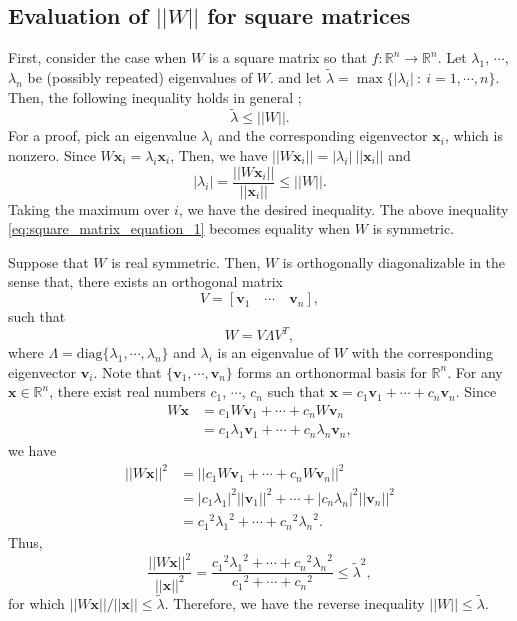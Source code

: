 \documentclass[12pt]{report}
\numberwithin{figure}{chapter}
\theoremstyle{plain}
\theoremstyle{definition}
\theoremstyle{corollary}
\theoremstyle{definition}
\theoremstyle{plain}
\theoremstyle{definition}
\theoremstyle{plain}
\newcommand\bx{\ensuremath{\boldsymbol x}}
\newcommand\bv{\ensuremath{\boldsymbol v}}
\begin{document}
%
\subsection{Evaluation of \(||W||\) for square matrices}

First, consider the case when \(W\) is a square matrix so that \(f:\mathbb R^n\to\mathbb R^n\).
Let \(\lambda_1\), \(\cdots\), \(\lambda_n\) be (possibly repeated) eigenvalues of \(W\).
 and let \(\tilde\lambda=\max\{|\lambda_i|\::\:i=1,\cdots,n\}\).
Then, the following inequality holds in general ;
\begin{equation}\label{eq:square_matrix_equation_1}
\tilde\lambda\le||W||.
\end{equation}
For a proof, pick an eigenvalue \(\lambda_i\) and the corresponding eigenvector \(\bx_i\), which is nonzero.
Since \(W\bx_i=\lambda_i\bx_i\),
Then, we have \(||W\bx_i||=|\lambda_i|\:||\bx_i||\) and
\[|\lambda_i|=\frac{||W\bx_i||}{||\bx_i||}\le||W||.\]
Taking the maximum over \(i\), we have the desired inequality.
The above inequality \eqref{eq:square_matrix_equation_1} becomes equality when \(W\) is symmetric.

Suppose that \(W\) is real symmetric.
Then, \(W\) is orthogonally diagonalizable in the sense that, there exists an orthogonal matrix
\[V=[\bv_1\quad \cdots \quad \bv_n],\]
such that
\[W=V\Lambda V^T,\]
where \(\Lambda=\text{diag}\{\lambda_1,\cdots,\lambda_n\}\) and \(\lambda_i\) is an eigenvalue of \(W\) with the corresponding eigenvector \(\bv_i\).
Note that \(\{\bv_1,\cdots,\bv_n\}\) forms an orthonormal basis for \(\mathbb R^n\).
For any \(\bx\in\mathbb R^n\), there exist real numbers \(c_1\), \(\cdots\), \(c_n\) such that \(\bx=c_1\bv_1+\cdots+c_n\bv_n\).
Since
\begin{align*}
W\bx
&=c_1W\bv_1+\cdots+c_nW\bv_n\\
&=c_1\lambda_1\bv_1+\cdots+c_n\lambda_n\bv_n,
\end{align*}
we have
\begin{align*}
||W\bx||^2
&=||c_1W\bv_1+\cdots+c_nW\bv_n||^2\\
&=|c_1\lambda_1|^2||\bv_1||^2+\cdots+|c_n\lambda_n|^2||\bv_n||^2\\
&={c_1}^2{\lambda_1}^2+\cdots+{c_n}^2{\lambda_n}^2.
\end{align*}
Thus,
\[\frac{||W\bx||^2}{||\bx||^2}=\frac{{c_1}^2{\lambda_1}^2+\cdots+{c_n}^2{\lambda_n}^2}{{c_1}^2+\cdots+{c_n}^2}
\le{\tilde\lambda}^2,\]
for which \(||W\bx||/||\bx||\le\tilde\lambda\).
Therefore, we have the reverse inequality \(||W||\le\tilde\lambda\).
\end{document}
